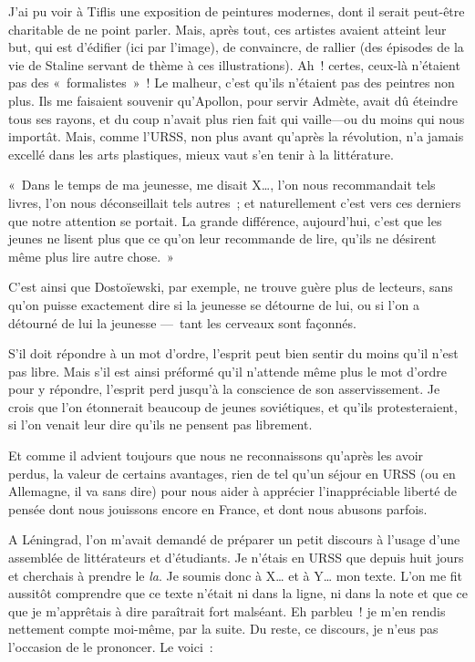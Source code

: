 \documentclass[twoside]{book} %
\begin{document}
\noindent J’ai pu voir à Tiflis une exposition de peintures modernes, dont il serait peut-être charitable de ne point parler. Mais, après tout, ces artistes avaient atteint leur but, qui est d’édifier (ici par l’image), de convaincre, de rallier (des épisodes de la vie de Staline servant de thème à ces illustrations). Ah ! certes, ceux-là n’étaient pas des « formalistes » ! Le malheur, c’est qu’ils n’étaient pas des peintres non plus. Ils me faisaient souvenir qu’Apollon, pour servir Admète, avait dû éteindre tous ses rayons, et du coup n’avait plus rien fait qui vaille—ou du moins qui nous importât. Mais, comme l’URSS, non plus avant qu’après la révolution, n’a jamais excellé dans les arts plastiques, mieux vaut s’en tenir à la littérature.\par
« Dans le temps de ma jeunesse, me disait X…, l’on nous recommandait tels livres, l’on nous déconseillait tels autres ; et naturellement c’est vers ces derniers que notre attention se portait. La grande différence, aujourd’hui, c’est que les jeunes ne lisent plus que ce qu’on leur recommande de lire, qu’ils ne désirent même plus lire autre chose. »\par
C’est ainsi que Dostoïewski, par exemple, ne trouve guère plus de lecteurs, sans qu’on puisse exactement dire si la jeunesse se détourne de lui, ou si l’on a détourné de lui la jeunesse — tant les cerveaux sont façonnés.\par
S’il doit répondre à un mot d’ordre, l’esprit peut bien sentir du moins qu’il n’est pas libre. Mais s’il est ainsi préformé qu’il n’attende même plus le mot d’ordre pour y répondre, l’esprit perd jusqu’à la conscience de son asservissement. Je crois que l’on étonnerait beaucoup de jeunes soviétiques, et qu’ils protesteraient, si l’on venait leur dire qu’ils ne pensent pas librement.\par
Et comme il advient toujours que nous ne reconnaissons qu’après les avoir perdus, la valeur de certains avantages, rien de tel qu’un séjour en URSS (ou en Allemagne, il va sans dire) pour nous aider à apprécier l’inappréciable liberté de pensée dont nous jouissons encore en France, et dont nous abusons parfois.\par
A Léningrad, l’on m’avait demandé de préparer un petit discours à l’usage d’une assemblée de littérateurs et d’étudiants. Je n’étais en URSS que depuis huit jours et cherchais à prendre le \emph{la}. Je soumis donc à X… et à Y… mon texte. L’on me fit aussitôt comprendre que ce texte n’était ni dans la ligne, ni dans la note et que ce que je m’apprêtais à dire paraîtrait fort malséant. Eh parbleu ! je m’en rendis nettement compte moi-même, par la suite. Du reste, ce discours, je n’eus pas l’occasion de le prononcer. Le voici :\par
\end{document}
